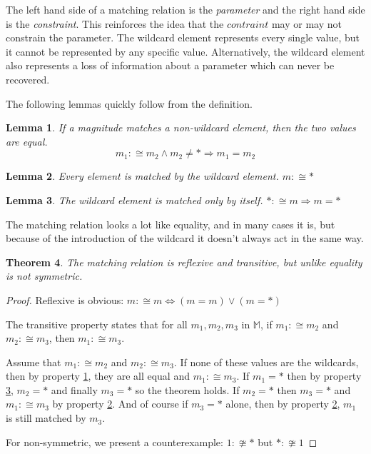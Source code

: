 \documentclass[twoside]{article}
\theoremstyle{plain}%
\newtheorem{theorem}{Theorem}[section]
\newtheorem{lemma}[theorem]{Lemma}
\theoremstyle{definition}
\theoremstyle{remark}
\begin{document}
The left hand side of a matching relation is the \textit{parameter} and the right hand side is the \textit{constraint}. This reinforces the idea that the \(contraint\) may or may not constrain the parameter. The wildcard element represents every single value, but it cannot be represented by any specific value. Alternatively, the wildcard element also represents a loss of information about a parameter which can never be recovered.

The following lemmas quickly follow from the definition.

\begin{lemma}
\label{wild_prop_1} If a magnitude matches a non-wildcard element, then the two values are equal. \[m_1 :\cong m_2 \wedge m_2 \neq \ast \Longrightarrow m_1 = m_2\]
\end{lemma}

\begin{lemma}
\label{wild_prop_2}
Every element is matched by the wildcard element. \(m :\cong \ast\)
\end{lemma}

\begin{lemma}
\label{wild_prop_3}
The wildcard element is matched only by itself. \(\ast :\cong m \Longrightarrow m = \ast\)
\end{lemma}

The matching relation looks a lot like equality, and in many cases it is, but because of the introduction of the wildcard it doesn't always act in the same way.

\begin{theorem}
The matching relation is reflexive and transitive, but unlike equality is not symmetric.
\end{theorem}

\begin{proof}
Reflexive is obvious: \(m :\cong m \Longleftrightarrow (m = m) \vee (m = \ast)\)

The transitive property states that for all \(m_1, m_2, m_3\) in \(\mathbb{M}\), if \(m_1 :\cong m_2\) and \(m_2 :\cong m_3\), then \(m_1 :\cong m_3\).

Assume that \(m_1 :\cong m_2\) and \(m_2 :\cong m_3\). If none of these values are the wildcards, then by property \ref{wild_prop_1}, they are all equal and \(m_1 :\cong m_3\). If \(m_1 = \ast\) then by property \ref{wild_prop_3}, \(m_2 = \ast\) and finally \(m_3 = \ast\) so the theorem holds. If \(m_2 = \ast\) then \(m_3 = \ast\) and \(m_1 :\cong m_3\) by property \ref{wild_prop_2}. And of course if \(m_3 = \ast\) alone, then by property \ref{wild_prop_2}, \(m_1\) is still matched by \(m_3\).

For non-symmetric, we present a counterexample: \(1 :\ncong \ast\) but \(\ast :\ncong 1\)
\end{proof}
\end{document}
